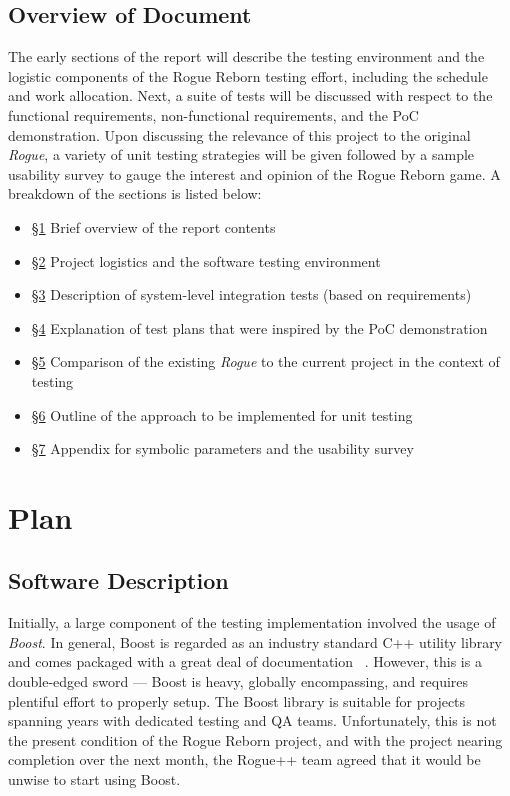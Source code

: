 \documentclass[12pt, titlepage]{article}
\begin{document}
	\subsection{Overview of Document}
		The early sections of the report will describe the testing environment and the logistic components of the Rogue Reborn testing effort, including the schedule and work allocation.  Next, a suite of tests will be discussed with respect to the functional requirements, non-functional requirements, and the PoC demonstration.  Upon discussing the relevance of this project to the original \textit{Rogue}, a variety of unit testing strategies will be given followed by a sample usability survey to gauge the interest and opinion of the Rogue Reborn game.  A breakdown of the sections is listed below:

		\begin{itemize}
			\item [] \hyperref[section1]{\S 1} Brief overview of the report contents
			\item [] \hyperref[section2]{\S 2} Project logistics and the software testing environment
			\item [] \hyperref[section3]{\S 3} Description of system-level integration tests (based on requirements)
			\item [] \hyperref[section4]{\S 4} Explanation of test plans that were inspired by the PoC demonstration
			\item [] \hyperref[section5]{\S 5} Comparison of the existing \textit{Rogue} to the current project in the context of testing
			\item [] \hyperref[section6]{\S 6} Outline of the approach to be implemented for unit testing  
			\item [] \hyperref[section7]{\S 7} Appendix for symbolic parameters and the usability survey
		\end{itemize}

\newpage
\section{Plan}
\label{section2}
		
	\subsection{Software Description}

	Initially, a large component of the testing implementation involved the usage of \textit{Boost}.  In general, Boost is regarded as an industry standard C++ utility library and comes packaged with a great deal of documentation ~\citep{BoostHome}.  However, this is a double-edged sword --- Boost is heavy, globally encompassing, and requires plentiful effort to properly setup.  The Boost library is suitable for projects spanning years with dedicated testing and QA teams.  Unfortunately, this is not the present condition of the Rogue Reborn project, and with the project nearing completion over the next month, the Rogue++ team agreed that it would be unwise to start using Boost.\\
\end{document}
